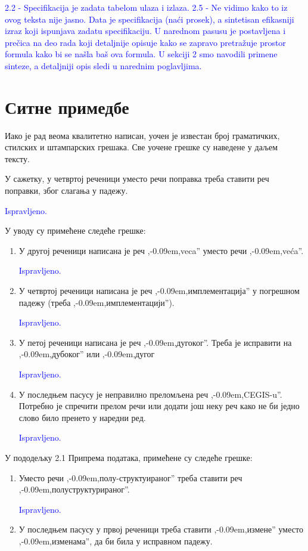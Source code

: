 \documentclass[a4paper]{report}
\newcommand{\odgovor}[1]{\textcolor{blue}{#1}}
\def\zn{,\kern-0.09em,}
\begin{document}
\odgovor{2.2 - Specifikacija je zadata tabelom ulaza i izlaza.}
\odgovor{2.5 - Ne vidimo kako to iz ovog teksta nije jasno. Data je specifikacija (naći prosek), a sintetisan efikasniji izraz koji ispunjava zadatu specifikaciju. U narednom pasusu je postavljena i prečica na deo rada koji detaljnije opisuje kako se zapravo pretražuje prostor formula kako bi se našla baš ova formula. U sekciji 2 smo navodili primene sinteze, a detaljniji opis sledi u narednim poglavljima.}

\section{Ситне примедбе}
\par Иако је рад веома квалитетно написан, уочен је известан број граматичких, стилских и штампарских грешака. Све уочене грешке су наведене у даљем тексту.

\par У сажетку, у четвртој реченици уместо речи поправка треба ставити реч поправки, због слагања у падежу.

\odgovor {Ispravljeno.}

\par У уводу су примећене следеће грешке:
\begin{enumerate}
\item У другој реченици написана је реч \zn veca'' уместо речи \zn veća''.

\odgovor{Ispravljeno.}

\item У четвртој реченици написана је реч \zn имплементација'' у погрешном падежу (треба \zn имплементацији'').

\odgovor{Ispravljeno.}

\item У петој реченици написана је реч \zn дугоког''. Треба је исправити на \zn дубоког'' или \zn дугог

\odgovor{Ispravljeno.}

\item У последњем пасусу је неправилно преломљена реч \zn CEGIS-u''. Потребно је спречити прелом речи или додати још неку реч како не би једно слово било пренето у наредни ред.

\odgovor{Ispravljeno.}

\end{enumerate}

\par У пододељку 2.1 Припрема података, примећене су следеће грешке:
\begin{enumerate}
\item Уместо речи \zn полу-структуираног'' треба ставити реч \zn полуструктурираног''.

\odgovor{Ispravljeno.}

\item У последњем пасусу у првој реченици треба ставити \zn измене'' уместо \zn изменама'', да би била у исправном падежу.
\end{enumerate}
\end{document}

